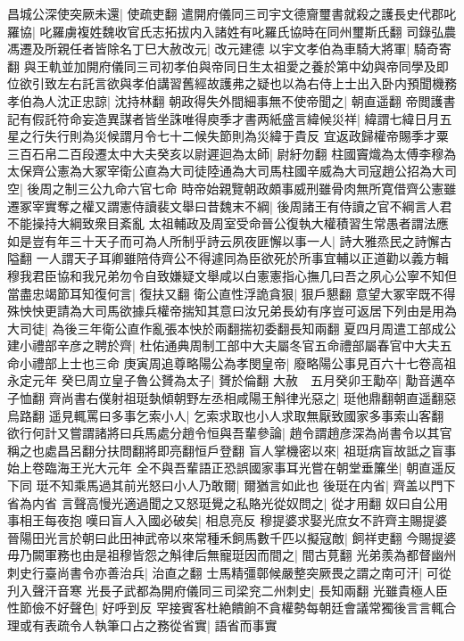 昌城公深使突厥未還|{
	使疏吏翻}
遣開府儀同三司宇文德齎璽書就殺之護長史代郡叱羅協|{
	叱羅虜複姓魏收官氏志拓拔内入諸姓有叱羅氏協時在同州璽斯氏翻}
司錄弘農馮遷及所親任者皆除名丁巳大赦改元|{
	改元建德}
以宇文孝伯為車騎大將軍|{
	騎奇寄翻}
與王軌並加開府儀同三司初孝伯與帝同日生太祖愛之養於第中幼與帝同學及即位欲引致左右託言欲與孝伯講習舊經故護弗之疑也以為右侍上士出入卧内預聞機務孝伯為人沈正忠諒|{
	沈持林翻}
朝政得失外間細事無不使帝聞之|{
	朝直遥翻}
帝閲護書記有假託符命妄造異謀者皆坐誅唯得庾季才書两紙盛言緯候災祥|{
	緯謂七緯日月五星之行失行則為災候謂月令七十二候失節則為災緯于貴反}
宜返政歸權帝賜季才粟三百石帛二百段遷太中大夫癸亥以尉遲迴為太師|{
	尉紆勿翻}
柱國竇熾為太傅李穆為太保齊公憲為大冢宰衛公直為大司徒陸通為大司馬柱國辛威為大司寇趙公招為大司空|{
	後周之制三公九命六官七命}
時帝始親覽朝政頗事威刑雖骨肉無所寛借齊公憲雖遷冢宰實奪之權又謂憲侍讀裴文舉曰昔魏末不綱|{
	後周諸王有侍讀之官不綱言人君不能操持大綱致衆目紊亂}
太祖輔政及周室受命晉公復執大權積習生常愚者謂法應如是豈有年三十天子而可為人所制乎詩云夙夜匪懈以事一人|{
	詩大雅烝民之詩懈古隘翻}
一人謂天子耳卿雖陪侍齊公不得遽同為臣欲死於所事宜輔以正道勸以義方輯穆我君臣協和我兄弟勿令自致嫌疑文舉咸以白憲憲指心撫几曰吾之夙心公寧不知但當盡忠竭節耳知復何言|{
	復扶又翻}
衛公直性浮詭貪狠|{
	狠戶懇翻}
意望大冢宰既不得殊怏怏更請為大司馬欲據兵權帝揣知其意曰汝兄弟長幼有序豈可返居下列由是用為大司徒|{
	為後三年衛公直作亂張本怏於兩翻揣初委翻長知兩翻}
夏四月周遣工部成公建小禮部辛彦之聘於齊|{
	杜佑通典周制工部中大夫屬冬官五命禮部屬春官中大夫五命小禮部上士也三命}
庚寅周追尊略陽公為孝閔皇帝|{
	廢略陽公事見百六十七卷高祖永定元年}
癸巳周立皇子魯公贇為太子|{
	贇於倫翻}
大赦　五月癸卯王勱卒|{
	勱音邁卒子恤翻}
齊尚書右僕射祖珽埶傾朝野左丞相咸陽王斛律光惡之|{
	珽他鼎翻朝直遥翻惡烏路翻}
遥見輒罵曰多事乞索小人|{
	乞索求取也小人求取無厭致國家多事索山客翻}
欲行何計又嘗謂諸將曰兵馬處分趙令恒與吾輩參論|{
	趙令謂趙彦深為尚書令以其官稱之也處昌呂翻分扶問翻將即亮翻恒戶登翻}
盲人掌機密以來|{
	祖珽病盲故詆之盲事始上卷臨海王光大元年}
全不與吾輩語正恐誤國家事耳光嘗在朝堂垂簾坐|{
	朝直遥反下同}
珽不知乘馬過其前光怒曰小人乃敢爾|{
	爾猶言如此也}
後珽在内省|{
	齊盖以門下省為内省}
言聲高慢光適過聞之又怒珽覺之私賂光從奴問之|{
	從才用翻}
奴曰自公用事相王每夜抱嘆曰盲人入國必破矣|{
	相息亮反}
穆提婆求娶光庶女不許齊主賜提婆晉陽田光言於朝曰此田神武帝以來常種禾飼馬數千匹以擬寇敵|{
	飼祥吏翻}
今賜提婆毋乃闕軍務也由是祖穆皆怨之斛律后無寵珽因而間之|{
	間古莧翻}
光弟羨為都督幽州刺史行臺尚書令亦善治兵|{
	治直之翻}
士馬精彊鄣候嚴整突厥畏之謂之南可汗|{
	可從刋入聲汗音寒}
光長子武都為開府儀同三司梁兖二州刺史|{
	長知兩翻}
光雖貴極人臣性節儉不好聲色|{
	好呼到反}
罕接賓客杜絶饋餉不貪權勢每朝廷會議常獨後言言輒合理或有表疏令人執筆口占之務從省實|{
	語省而事實}
